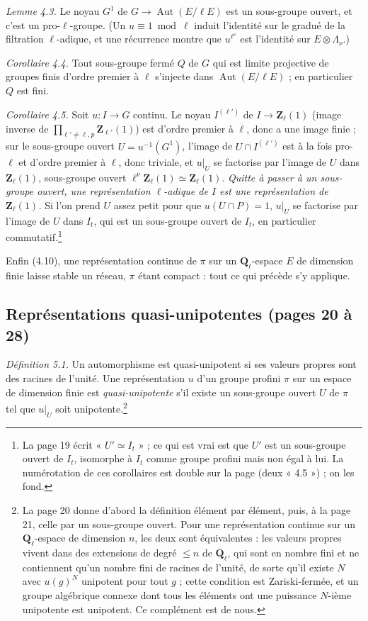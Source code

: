 \documentclass[11pt,a4paper]{article}
\begin{document}
\emph{Lemme 4.3.} Le noyau $G^1$ de $G \to \operatorname{Aut}(E/\ell E)$ est un
sous-groupe ouvert, et c'est un pro-$\ell$-groupe. (Un $u \equiv 1 \bmod \ell$
induit l'identité sur le gradué de la filtration $\ell$-adique, et une
récurrence montre que $u^{\ell^\nu}$ est l'identité sur $E \otimes \Lambda_\nu$.)

\emph{Corollaire 4.4.} Tout sous-groupe fermé $Q$ de $G$ qui est limite projective
de groupes finis d'ordre premier à $\ell$ s'injecte dans
$\operatorname{Aut}(E/\ell E)$ ; en particulier $Q$ est fini.

\emph{Corollaire 4.5.} Soit $u : I \to G$ continu. Le noyau $I^{(\ell')}$ de
$I \to \mathbf{Z}_\ell(1)$ (image inverse de $\prod_{\ell'\neq\ell,p}
\mathbf{Z}_{\ell'}(1)$) est d'ordre premier à $\ell$, donc a une image finie ;
sur le sous-groupe ouvert $U = u^{-1}(G^1)$, l'image de $U \cap I^{(\ell')}$ est
à la fois pro-$\ell$ et d'ordre premier à $\ell$, donc triviale, et $u|_U$ se
factorise par l'image de $U$ dans $\mathbf{Z}_\ell(1)$, sous-groupe ouvert
$\ell^\nu\mathbf{Z}_\ell(1) \simeq \mathbf{Z}_\ell(1)$. \emph{Quitte à passer à
un sous-groupe ouvert, une représentation $\ell$-adique de $I$ est une
représentation de $\mathbf{Z}_\ell(1)$.} Si l'on prend $U$ assez petit pour que
$u(U \cap P) = 1$, $u|_U$ se factorise par l'image de $U$ dans $I_t$, qui est un
sous-groupe ouvert de $I_t$, en particulier commutatif.\footnote{La page 19
écrit « $U' \simeq I_t$ » ; ce qui est vrai est que $U'$ est un sous-groupe
ouvert de $I_t$, isomorphe à $I_t$ comme groupe profini mais non égal à lui.
La numérotation de ces corollaires est double sur la page (deux « 4.5 ») ; on
les fond.}

Enfin (4.10), une représentation continue de $\pi$ sur un $\mathbf{Q}_\ell$-espace
$E$ de dimension finie laisse stable un réseau, $\pi$ étant compact : tout ce
qui précède s'y applique.

\subsection*{Représentations quasi-unipotentes (pages 20 à 28)}

\emph{Définition 5.1.} Un automorphisme est quasi-unipotent si ses valeurs propres
sont des racines de l'unité. Une représentation $u$ d'un groupe profini $\pi$ sur
un espace de dimension finie est \emph{quasi-unipotente} s'il existe un
sous-groupe ouvert $U$ de $\pi$ tel que $u|_U$ soit unipotente.\footnote{La page
20 donne d'abord la définition élément par élément, puis, à la page 21, celle par
un sous-groupe ouvert. Pour une représentation continue sur un
$\mathbf{Q}_\ell$-espace de dimension $n$, les deux sont équivalentes : les
valeurs propres vivent dans des extensions de degré $\leq n$ de
$\mathbf{Q}_\ell$, qui sont en nombre fini et ne contiennent qu'un nombre fini de
racines de l'unité, de sorte qu'il existe $N$ avec $u(g)^N$ unipotent pour tout
$g$ ; cette condition est Zariski-fermée, et un groupe algébrique connexe dont
tous les éléments ont une puissance $N$-ième unipotente est unipotent. Ce
complément est de nous.}
\end{document}
